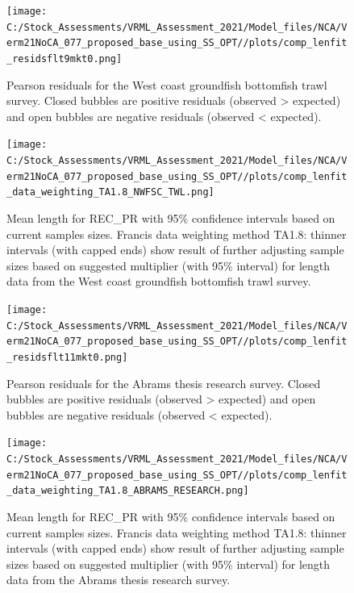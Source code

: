 \documentclass[
  english,
  a4paper,
]{article}
\begin{document}
\begin{figure}
\centering
\texttt{[image: C:/Stock\_Assessments/VRML\_Assessment\_2021/Model\_files/NCA/Verm21NoCA\_077\_proposed\_base\_using\_SS\_OPT//plots/comp\_lenfit\_residsflt9mkt0.png]}
\caption{Pearson residuals for the West coast groundfish bottomfish trawl survey. Closed bubbles are positive residuals (observed \textgreater{} expected) and open bubbles are negative residuals (observed \textless{} expected).\label{fig:len-pearson-NWFSC-TWL}}
\end{figure}

\begin{figure}
\centering
\texttt{[image: C:/Stock\_Assessments/VRML\_Assessment\_2021/Model\_files/NCA/Verm21NoCA\_077\_proposed\_base\_using\_SS\_OPT//plots/comp\_lenfit\_data\_weighting\_TA1.8\_NWFSC\_TWL.png]}
\caption{Mean length for REC\_PR with 95\% confidence intervals based on current samples sizes. Francis data weighting method TA1.8: thinner intervals (with capped ends) show result of further adjusting sample sizes based on suggested multiplier (with 95\% interval) for length data from the West coast groundfish bottomfish trawl survey.\label{fig:mean-len-fit-NWFSC-TWL}}
\end{figure}

\begin{figure}
\centering
\texttt{[image: C:/Stock\_Assessments/VRML\_Assessment\_2021/Model\_files/NCA/Verm21NoCA\_077\_proposed\_base\_using\_SS\_OPT//plots/comp\_lenfit\_residsflt11mkt0.png]}
\caption{Pearson residuals for the Abrams thesis research survey. Closed bubbles are positive residuals (observed \textgreater{} expected) and open bubbles are negative residuals (observed \textless{} expected).\label{fig:len-pearson-ABRAMS-RESEARCH}}
\end{figure}

\begin{figure}
\centering
\texttt{[image: C:/Stock\_Assessments/VRML\_Assessment\_2021/Model\_files/NCA/Verm21NoCA\_077\_proposed\_base\_using\_SS\_OPT//plots/comp\_lenfit\_data\_weighting\_TA1.8\_ABRAMS\_RESEARCH.png]}
\caption{Mean length for REC\_PR with 95\% confidence intervals based on current samples sizes. Francis data weighting method TA1.8: thinner intervals (with capped ends) show result of further adjusting sample sizes based on suggested multiplier (with 95\% interval) for length data from the Abrams thesis research survey.\label{fig:mean-len-fit-ABRAMS-RESEARCH}}
\end{figure}
\end{document}
